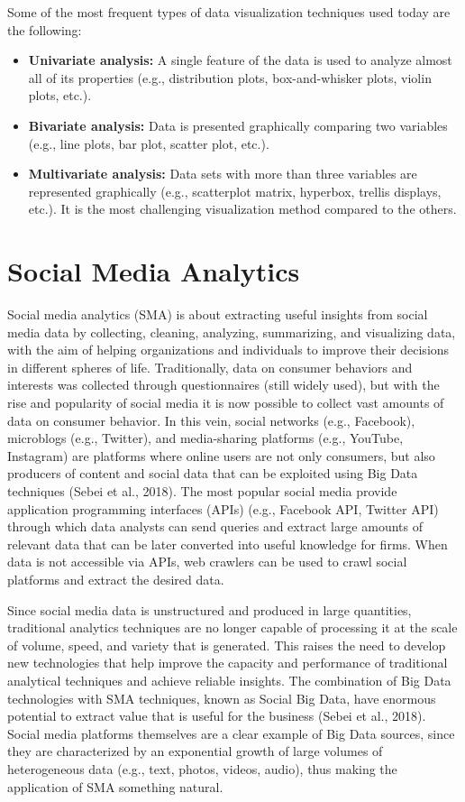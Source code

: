 \documentclass[
  letterpaper,
  DIV=11,
  numbers=noendperiod]{scrreprt}
\begin{document}
Some of the most frequent types of data visualization techniques used
today are the following:

\begin{itemize}
\item
  \textbf{Univariate analysis:} A single feature of the data is used to
  analyze almost all of its properties (e.g., distribution plots,
  box-and-whisker plots, violin plots, etc.).
\item
  \textbf{Bivariate analysis:} Data is presented graphically comparing
  two variables (e.g., line plots, bar plot, scatter plot, etc.).
\item
  \textbf{Multivariate analysis:} Data sets with more than three
  variables are represented graphically (e.g., scatterplot matrix,
  hyperbox, trellis displays, etc.). It is the most challenging
  visualization method compared to the others.
\end{itemize}

\hypertarget{social-media-analytics}{%
\section{Social Media Analytics}\label{social-media-analytics}}

Social media analytics (SMA) is about extracting useful insights from
social media data by collecting, cleaning, analyzing, summarizing, and
visualizing data, with the aim of helping organizations and individuals
to improve their decisions in different spheres of life. Traditionally,
data on consumer behaviors and interests was collected through
questionnaires (still widely used), but with the rise and popularity of
social media it is now possible to collect vast amounts of data on
consumer behavior. In this vein, social networks (e.g., Facebook),
microblogs (e.g., Twitter), and media-sharing platforms (e.g., YouTube,
Instagram) are platforms where online users are not only consumers, but
also producers of content and social data that can be exploited using
Big Data techniques (Sebei et al., 2018). The most popular social media
provide application programming interfaces (APIs) (e.g., Facebook API,
Twitter API) through which data analysts can send queries and extract
large amounts of relevant data that can be later converted into useful
knowledge for firms. When data is not accessible via APIs, web crawlers
can be used to crawl social platforms and extract the desired data.

Since social media data is unstructured and produced in large
quantities, traditional analytics techniques are no longer capable of
processing it at the scale of volume, speed, and variety that is
generated. This raises the need to develop new technologies that help
improve the capacity and performance of traditional analytical
techniques and achieve reliable insights. The combination of Big Data
technologies with SMA techniques, known as Social Big Data, have
enormous potential to extract value that is useful for the business
(Sebei et al., 2018). Social media platforms themselves are a clear
example of Big Data sources, since they are characterized by an
exponential growth of large volumes of heterogeneous data (e.g., text,
photos, videos, audio), thus making the application of SMA something
natural.
\end{document}
